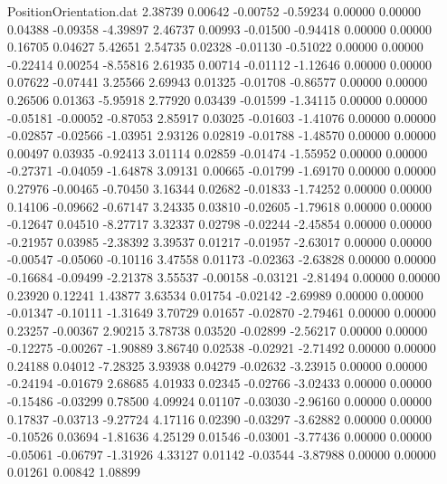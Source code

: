 \begin{filecontents}{PositionOrientation.dat}
   2.38739    0.00642   -0.00752    -0.59234    0.00000    0.00000    0.04388   -0.09358   -4.39897
   2.46737    0.00993   -0.01500    -0.94418    0.00000    0.00000    0.16705    0.04627    5.42651
   2.54735    0.02328   -0.01130    -0.51022    0.00000    0.00000   -0.22414    0.00254   -8.55816
   2.61935    0.00714   -0.01112    -1.12646    0.00000    0.00000    0.07622   -0.07441    3.25566
   2.69943    0.01325   -0.01708    -0.86577    0.00000    0.00000    0.26506    0.01363   -5.95918
   2.77920    0.03439   -0.01599    -1.34115    0.00000    0.00000   -0.05181   -0.00052   -0.87053
   2.85917    0.03025   -0.01603    -1.41076    0.00000    0.00000   -0.02857   -0.02566   -1.03951
   2.93126    0.02819   -0.01788    -1.48570    0.00000    0.00000    0.00497    0.03935   -0.92413
   3.01114    0.02859   -0.01474    -1.55952    0.00000    0.00000   -0.27371   -0.04059   -1.64878
   3.09131    0.00665   -0.01799    -1.69170    0.00000    0.00000    0.27976   -0.00465   -0.70450
   3.16344    0.02682   -0.01833    -1.74252    0.00000    0.00000    0.14106   -0.09662   -0.67147
   3.24335    0.03810   -0.02605    -1.79618    0.00000    0.00000   -0.12647    0.04510   -8.27717
   3.32337    0.02798   -0.02244    -2.45854    0.00000    0.00000   -0.21957    0.03985   -2.38392
   3.39537    0.01217   -0.01957    -2.63017    0.00000    0.00000   -0.00547   -0.05060   -0.10116
   3.47558    0.01173   -0.02363    -2.63828    0.00000    0.00000   -0.16684   -0.09499   -2.21378
   3.55537   -0.00158   -0.03121    -2.81494    0.00000    0.00000    0.23920    0.12241    1.43877
   3.63534    0.01754   -0.02142    -2.69989    0.00000    0.00000   -0.01347   -0.10111   -1.31649
   3.70729    0.01657   -0.02870    -2.79461    0.00000    0.00000    0.23257   -0.00367    2.90215
   3.78738    0.03520   -0.02899    -2.56217    0.00000    0.00000   -0.12275   -0.00267   -1.90889
   3.86740    0.02538   -0.02921    -2.71492    0.00000    0.00000    0.24188    0.04012   -7.28325
   3.93938    0.04279   -0.02632    -3.23915    0.00000    0.00000   -0.24194   -0.01679    2.68685
   4.01933    0.02345   -0.02766    -3.02433    0.00000    0.00000   -0.15486   -0.03299    0.78500
   4.09924    0.01107   -0.03030    -2.96160    0.00000    0.00000    0.17837   -0.03713   -9.27724
   4.17116    0.02390   -0.03297    -3.62882    0.00000    0.00000   -0.10526    0.03694   -1.81636
   4.25129    0.01546   -0.03001    -3.77436    0.00000    0.00000   -0.05061   -0.06797   -1.31926
   4.33127    0.01142   -0.03544    -3.87988    0.00000    0.00000    0.01261    0.00842    1.08899

\end{filecontents}
